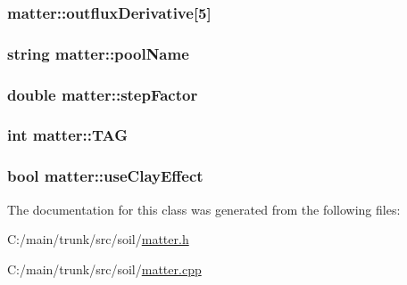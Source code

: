 \label{classmatter_a66af6caaa54804a6bcd353f587994a51}
\hypertarget{classmatter_aee1bc7ca345e58bd4e203af721b0c8d7}{
\subsubsection[{outfluxDerivative}]{ {\bf matter::outfluxDerivative}\mbox{[}5\mbox{]}}}
\label{classmatter_aee1bc7ca345e58bd4e203af721b0c8d7}
\hypertarget{classmatter_aa5a52c9da8fc5f18e214c66c92bf3759}{
\subsubsection[{poolName}]{\setlength{\rightskip}{0pt plus 5cm}string {\bf matter::poolName}}}
\label{classmatter_aa5a52c9da8fc5f18e214c66c92bf3759}
\hypertarget{classmatter_a04cfcfcbd4523bfbcb6ae73808f1796b}{
\subsubsection[{stepFactor}]{\setlength{\rightskip}{0pt plus 5cm}double {\bf matter::stepFactor}}}
\label{classmatter_a04cfcfcbd4523bfbcb6ae73808f1796b}
\hypertarget{classmatter_aa5542096a167bed6ed8eafd696816599}{
\subsubsection[{TAG}]{\setlength{\rightskip}{0pt plus 5cm}int {\bf matter::TAG}}}
\label{classmatter_aa5542096a167bed6ed8eafd696816599}
\hypertarget{classmatter_ad8689f25569a1686e00d30c19c3d3cd5}{
\subsubsection[{useClayEffect}]{\setlength{\rightskip}{0pt plus 5cm}bool {\bf matter::useClayEffect}}}
\label{classmatter_ad8689f25569a1686e00d30c19c3d3cd5}


The documentation for this class was generated from the following files:\begin{DoxyCompactItemize}
\item 
C:/main/trunk/src/soil/\hyperlink{matter_8h}{matter.h}\item 
C:/main/trunk/src/soil/\hyperlink{matter_8cpp}{matter.cpp}\end{DoxyCompactItemize}
